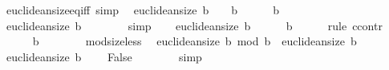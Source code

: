 \begin{isabellebody}
\isanewline
\isanewline
{}\isamarkupfalse%
\ euclidean{\isacharunderscore}{\kern0pt}size{\isacharunderscore}{\kern0pt}eq{\isacharunderscore}{\kern0pt}{}{\isacharunderscore}{\kern0pt}iff\ {\isacharbrackleft}{\kern0pt}simp{\isacharbrackright}{\kern0pt}{\isacharcolon}{\kern0pt}\isanewline
\ \ {\isachardoublequoteopen}euclidean{\isacharunderscore}{\kern0pt}size\ b\ {\isacharequal}{\kern0pt}\ {}\ {\isasymlongleftrightarrow}\ b\ {\isacharequal}{\kern0pt}\ {}{\isachardoublequoteclose}\isanewline
%
\isadelimproof
%
\endisadelimproof
%
\isatagproof
{}\isamarkupfalse%
\isanewline
\ \ \isamarkupfalse%
\ {\isachardoublequoteopen}b\ {\isacharequal}{\kern0pt}\ {}{\isachardoublequoteclose}\isanewline
\ \ \isamarkupfalse%
\ \isamarkupfalse%
\ {\isachardoublequoteopen}euclidean{\isacharunderscore}{\kern0pt}size\ b\ {\isacharequal}{\kern0pt}\ {}{\isachardoublequoteclose}\isanewline
\ \ \ \ \isamarkupfalse%
\ simp\isanewline
{}\isamarkupfalse%
\isanewline
\ \ \isamarkupfalse%
\ {\isachardoublequoteopen}euclidean{\isacharunderscore}{\kern0pt}size\ b\ {\isacharequal}{\kern0pt}\ {}{\isachardoublequoteclose}\isanewline
\ \ \isamarkupfalse%
\ {\isachardoublequoteopen}b\ {\isacharequal}{\kern0pt}\ {}{\isachardoublequoteclose}\isanewline
\ \ \isamarkupfalse%
\ {\isacharparenleft}{\kern0pt}rule\ ccontr{\isacharparenright}{\kern0pt}\isanewline
\ \ \ \ \isamarkupfalse%
\ {\isachardoublequoteopen}b\ {\isasymnoteq}\ {}{\isachardoublequoteclose}\isanewline
\ \ \ \ \isamarkupfalse%
\ mod{\isacharunderscore}{\kern0pt}size{\isacharunderscore}{\kern0pt}less\ \isamarkupfalse%
\ {\isachardoublequoteopen}euclidean{\isacharunderscore}{\kern0pt}size\ {\isacharparenleft}{\kern0pt}b\ mod\ b{\isacharparenright}{\kern0pt}\ {\isacharless}{\kern0pt}\ euclidean{\isacharunderscore}{\kern0pt}size\ b{\isachardoublequoteclose}\ \isacommand{{\isachardot}{\kern0pt}}\isamarkupfalse%
\isanewline
\ \ \ \ \isamarkupfalse%
\ {\isacartoucheopen}euclidean{\isacharunderscore}{\kern0pt}size\ b\ {\isacharequal}{\kern0pt}\ {}{\isacartoucheclose}\ \isamarkupfalse%
\ False\isanewline
\ \ \ \ \ \ \isamarkupfalse%
\ simp\isanewline
\ \ \isamarkupfalse%
\isanewline
{}\isamarkupfalse%
%
\endisatagproof
{\isafoldproof}%

\end{isabellebody}
